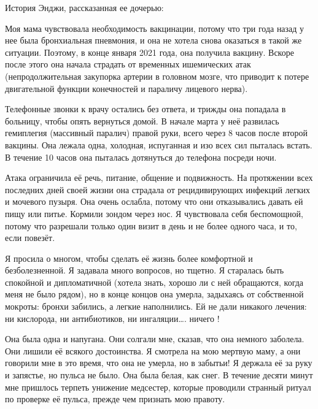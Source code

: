 История Энджи, рассказанная ее дочерью:

Моя мама чувствовала необходимость вакцинации, потому что три года назад у нее
была бронхиальная пневмония, и она не хотела снова оказаться в такой же
ситуации. Поэтому, в конце января 2021 года, она получила вакцину. Вскоре после
этого она начала страдать от временных ишемических атак (непродолжительная
закупорка артерии в головном мозге, что приводит к потере двигательной функции
конечностей и параличу лицевого нерва).

Телефонные звонки к врачу остались без ответа, и трижды она попадала в больницу,
чтобы опять вернуться домой. В начале марта у неё развилась гемиплегия
(массивный паралич) правой руки, всего через 8 часов после второй вакцины. Она
лежала одна, холодная, испуганная и изо всех сил пыталась встать. В течение 10
часов она пыталась дотянуться до телефона посреди ночи.

Атака ограничила её речь, питание, общение и подвижность. На протяжении всех
последних дней своей жизни она страдала от рецидивирующих инфекций легких и
мочевого пузыря. Она очень ослабла, потому что они отказывались давать ей пищу
или питье. Кормили зондом через нос. Я чувствовала себя беспомощной, потому что
разрешали только один визит в день и не более одного часа, и то, если повезёт.

Я просила о многом, чтобы сделать её жизнь более комфортной и безболезненной. Я
задавала много вопросов, но тщетно. Я старалась быть спокойной и дипломатичной
(хотела знать, хорошо ли с ней обращаются, когда меня не было рядом), но в конце
концов она умерла, задыхаясь от собственной мокроты: бронхи забились, а легкие
наполнились. Ей не дали никакого лечения: ни кислорода, ни антибиотиков, ни
ингаляции…. ничего !

Она была одна и напугана. Они солгали мне, сказав, что она немного заболела. Они
лишили её всякого достоинства. Я смотрела на мою мертвую маму, а они говорили
мне в это время, что она не умерла, но в забытьи! Я держала её за руку и
запястье, но пульса не было. Она была белая, как снег. В течение десяти минут
мне пришлось терпеть унижение медсестер, которые проводили странный ритуал по
проверке её пульса, прежде чем признать мою правоту.

